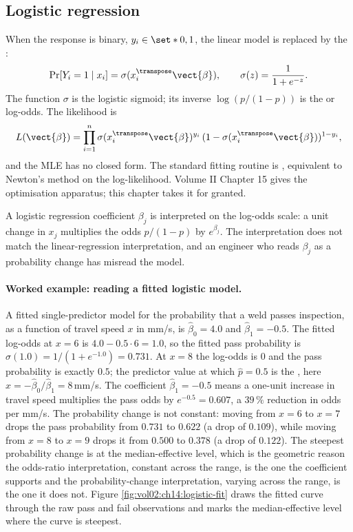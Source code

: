 \subsection{Logistic regression}

When the response is binary, $y_{i} \in \set*{0, 1}$, the linear
model is replaced by the :
\[
\Pr[Y_{i} = 1 \mid x_{i}] = \sigma(x_{i}^{\transpose}\vect{\beta}),
\qquad \sigma(z) = \frac{1}{1 + e^{-z}}.
\]
The function $\sigma$ is the logistic sigmoid; its inverse $\log
(p/(1-p))$ is the  or log-odds. The likelihood is
\[
L(\vect{\beta}) = \prod_{i=1}^{n}
   \sigma(x_{i}^{\transpose}\vect{\beta})^{y_{i}}\,
   (1 - \sigma(x_{i}^{\transpose}\vect{\beta}))^{1 - y_{i}},
\]
and the MLE has no closed form. The standard fitting routine is
, equivalent to
Newton's method on the log-likelihood. Volume II Chapter 15 gives
the optimisation apparatus; this chapter takes it for granted.

A logistic regression coefficient $\beta_{j}$ is interpreted on the
log-odds scale: a unit change in $x_{j}$ multiplies the odds
$p/(1-p)$ by $e^{\beta_{j}}$. The interpretation does not match the
linear-regression interpretation, and an engineer who reads
$\beta_{j}$ as a probability change has misread the model.

\paragraph{Worked example: reading a fitted logistic model.} A
fitted single-predictor model for the probability that a weld
passes inspection, as a function of travel speed $x$ in mm/s, is
$\hat{\beta}_{0} = 4.0$ and $\hat{\beta}_{1} = -0.5$. The fitted
log-odds at $x = 6$ is $4.0 - 0.5 \cdot 6 = 1.0$, so the fitted
pass probability is $\sigma(1.0) = 1/(1 + e^{-1.0}) = 0.731$. At
$x = 8$ the log-odds is $0$ and the pass probability is exactly
$0.5$; the predictor value at which $\hat{p} = 0.5$ is the
, here $x = -\hat{\beta}_{0}/
\hat{\beta}_{1} = 8\,$mm/s. The coefficient $\hat{\beta}_{1} =
-0.5$ means a one-unit increase in travel speed multiplies the
pass odds by $e^{-0.5} = 0.607$, a $39\,\%$ reduction in odds per
mm/s. The probability change is not constant: moving from
$x = 6$ to $x = 7$ drops the pass probability from $0.731$ to
$0.622$ (a drop of $0.109$), while moving from $x = 8$ to $x = 9$
drops it from $0.500$ to $0.378$ (a drop of $0.122$). The
steepest probability change is at the median-effective level, which
is the geometric reason the odds-ratio interpretation, constant
across the range, is the one the coefficient supports and the
probability-change interpretation, varying across the range, is the
one it does not. Figure \ref{fig:vol02:ch14:logistic-fit} draws the
fitted curve through the raw pass and fail observations and marks the
median-effective level where the curve is steepest.

